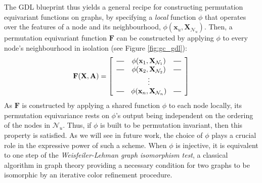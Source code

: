 %
The GDL blueprint thus yields a general recipe for constructing permutation equivariant functions on graphs, by specifying a \emph{local} function $\phi$ that operates over the features of a node and its neighbourhood, $\phi(\mathbf{x}_u, \mathbf{X}_{\mathcal{N}_u})$. Then, a permutation equivariant function $\mathbf{F}$ can be constructed by applying $\phi$ to every node's neighbourhood in isolation (see Figure \ref{fig:gc_gdl}):
\begin{equation}
    \mathbf{F}({\bf X}, {\bf A}) =
\left[
  \begin{array}{ccc}
    \horzbar & \phi(\mathbf{x}_1, \mathbf{X}_{\mathcal{N}_1}) & \horzbar \\
    \horzbar & \phi(\mathbf{x}_2, \mathbf{X}_{\mathcal{N}_2}) & \horzbar \\
             & \vdots    &          \\
    \horzbar & \phi(\mathbf{x}_n, \mathbf{X}_{\mathcal{N}_n}) & \horzbar
  \end{array}
\right]
\label{eq:graph_equivariant}
\end{equation}
As $\mathbf{F}$ is constructed by applying a shared function $\phi$ to each node locally, its permutation equivariance rests on $\phi$'s output being independent on the ordering of the nodes in $\mathcal{N}_u$. Thus, if $\phi$ is built to be permutation invariant, then this property is satisfied.
%
As we will see in future work, the choice of $\phi$ plays a crucial role in the expressive power of such a  scheme. When $\phi$ is injective, it is equivalent to one step of the {\em Weisfeiler-Lehman graph isomorphism test}, a classical algorithm in graph theory providing a necessary condition for two graphs to be isomorphic by an iterative color refinement procedure. 




